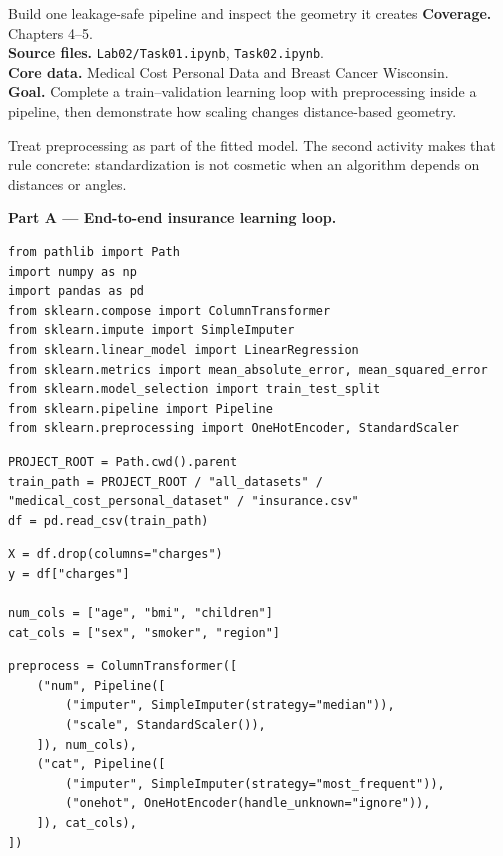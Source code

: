 
\begin{labproject}{Build one leakage-safe pipeline and inspect the geometry it creates}
\textbf{Coverage.} Chapters 4--5.\\
\textbf{Source files.} \texttt{Lab02/Task01.ipynb}, \texttt{Task02.ipynb}.\\
\textbf{Core data.} Medical Cost Personal Data and Breast Cancer Wisconsin.\\
\textbf{Goal.} Complete a train--validation learning loop with preprocessing inside a pipeline, then demonstrate how scaling changes distance-based geometry.

\begin{labmode}
Treat preprocessing as part of the fitted model. The second activity makes that rule concrete: standardization is not cosmetic when an algorithm depends on distances or angles.
\end{labmode}

\medskip\noindent\textbf{Part A --- End-to-end insurance learning loop.}\par
\begin{lstlisting}[style=mlpython]
from pathlib import Path
import numpy as np
import pandas as pd
from sklearn.compose import ColumnTransformer
from sklearn.impute import SimpleImputer
from sklearn.linear_model import LinearRegression
from sklearn.metrics import mean_absolute_error, mean_squared_error
from sklearn.model_selection import train_test_split
from sklearn.pipeline import Pipeline
from sklearn.preprocessing import OneHotEncoder, StandardScaler
\end{lstlisting}

\begin{lstlisting}[style=mlpython]
PROJECT_ROOT = Path.cwd().parent
train_path = PROJECT_ROOT / "all_datasets" / "medical_cost_personal_dataset" / "insurance.csv"
df = pd.read_csv(train_path)
\end{lstlisting}

\begin{lstlisting}[style=mlpython]
X = df.drop(columns="charges")
y = df["charges"]

num_cols = ["age", "bmi", "children"]
cat_cols = ["sex", "smoker", "region"]
\end{lstlisting}

\begin{lstlisting}[style=mlpython]
preprocess = ColumnTransformer([
    ("num", Pipeline([
        ("imputer", SimpleImputer(strategy="median")),
        ("scale", StandardScaler()),
    ]), num_cols),
    ("cat", Pipeline([
        ("imputer", SimpleImputer(strategy="most_frequent")),
        ("onehot", OneHotEncoder(handle_unknown="ignore")),
    ]), cat_cols),
])
\end{lstlisting}


\end{labproject}
